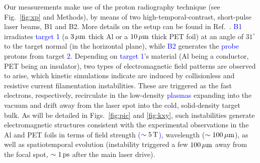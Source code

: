 \documentclass[aps,showpacs,superscriptaddress]{revtex4}
\begin{document}
Our measurements make use of the proton radiography technique (see Fig.~\ref{fig:xp} and Methods), by means of two high-temporal-contrast, short-pulse laser beams, B1 and B2. More details on the setup can be found in Ref.~\cite{RSI_Albertazzi_2015}.
\textcolor{blue}{B1} irradiates \textcolor{blue}{target 1} (a $3\,\rm \mu m$ thick Al or a $10\,\rm \mu m$ thick PET foil) at an angle of $31^\circ$ to the target normal (in the horizontal plane), while \textcolor{blue}{B2} generates the \textcolor{blue}{probe} protons from target \textcolor{blue}{2}. Depending on \textcolor{blue}{target 1}'s material (Al being a conductor, PET being an insulator), two types of electromagnetic field patterns are observed to arise, which kinetic simulations indicate are induced by collisionless and resistive current filamentation instabilities. These are triggered as the fast electrons, respectively, recirculate in the low-density \textcolor{blue}{plasmas} expanding into the vacuum and drift away from the laser spot into the cold, solid-density target bulk. As will be detailed in Figs.~\ref{fig:pic} and \ref{fig:kxy}, such instabilities generate electromagnetic structures consistent with the experimental observations in the Al and PET foils in terms of field strength \textcolor{blue}{($\sim 5\,\rm T$)}, wavelength ($\sim 100\,\rm \mu m$), as well as spatiotemporal evolution (instability triggered a few $100\,\rm \mu m$ away from the focal spot, $\sim 1\,\rm ps$ after the main laser drive).
%
\end{document}
